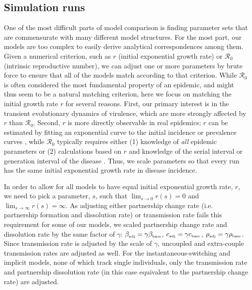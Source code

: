 \documentclass[10pt,letterpaper]{article}
\newcommand{\rzero}{{\mathcal R}_0}
\newcommand{\tsub}[2]{#1_{{\textrm{\tiny #2}}}}
\begin{document}
\subsection*{Simulation runs}

One of the most difficult parts of model comparison is finding
parameter sets that are commensurate with many different model
structures. For the most part, our models are too complex to easily
derive analytical correspondences among them. Given a numerical
criterion, such as $r$ (initial exponential growth rate) or $\rzero$ 
(intrinsic reproductive number), we can adjust one or more
parameters by brute force to ensure that all of the models match
according to that criterion. While $\rzero$ is often considered
the most fundamental property of an epidemic, and might thus seem to
be a natural matching criterion, here we focus on matching the initial
growth rate $r$ for several reasons. First, our primary interest is in
the transient evolutionary dynamics of virulence, which are more
strongly affected by $r$ than $\rzero$. Second, $r$ is 
more directly observable in real epidemics; $r$ can be estimated by
fitting an exponential curve to the initial incidence or
prevalence curves \cite{ma_estimating_2014}, while $\rzero$
typically requires either (1) knowledge of \emph{all} epidemic
parameters or (2) calculations based on
$r$ and knowledge of the serial interval or generation interval of the
disease \cite{wallinga_how_2007}. Thus, we scale parameters so that
every run has the same initial exponential growth rate in 
disease incidence.

In order to allow for all models to have equal initial exponential
growth rate, $r$, we need to pick a parameter, $s$, such that
$\lim_{s\to 0} r(s) = 0$ and $\lim_{s\to\infty} r(s) = \infty$. As
adjusting either partnership change rate (i.e. partnership formation
and dissolution rate) or transmission rate fails this requirement for
some of our models, we scaled partnership change rate and
dissolution rate by the same factor of $\gamma$: $\tsub{\beta}{adj} =
\gamma \tsub{\beta}{base}$, $\tsub{c}{adj} = \gamma \tsub{c}{base}$,
$\tsub{\rho}{adj} = \gamma \tsub{\rho}{base}$. Since transmission rate
is adjusted by the scale of $\gamma$, uncoupled and extra-couple
transmission rates are adjusted as well. For the instantaneous-switching
and implicit models, none of which track single individuals, 
only the transmission rate and partnership
dissolution rate (in this case equivalent to the partnership change
rate) are adjusted.
\end{document}
